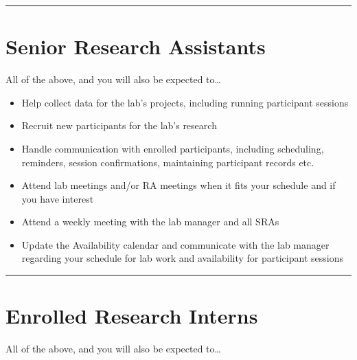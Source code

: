 \documentclass[]{book}
\providecommand{\tightlist}{%
  \setlength{\itemsep}{0pt}\setlength{\parskip}{0pt}}
\begin{document}
\begin{center}\rule{0.5\linewidth}{0.5pt}\end{center}

\hypertarget{senior-research-assistants}{%
\section{Senior Research Assistants}\label{senior-research-assistants}}

All of the above, and you will also be expected to\ldots{}

\begin{itemize}
\tightlist
\item
  Help collect data for the lab's projects, including running participant sessions
\item
  Recruit new participants for the lab's research
\item
  Handle communication with enrolled participants, including scheduling, reminders, session confirmations, maintaining participant records etc.
\item
  Attend lab meetings and/or RA meetings when it fits your schedule and if you have interest
\item
  Attend a weekly meeting with the lab manager and all SRAs
\item
  Update the Availability calendar and communicate with the lab manager regarding your schedule for lab work and availability for participant sessions
\end{itemize}

\begin{center}\rule{0.5\linewidth}{0.5pt}\end{center}

\hypertarget{enrolled-research-interns}{%
\section{Enrolled Research Interns}\label{enrolled-research-interns}}

All of the above, and you will also be expected to\ldots{}
\end{document}
